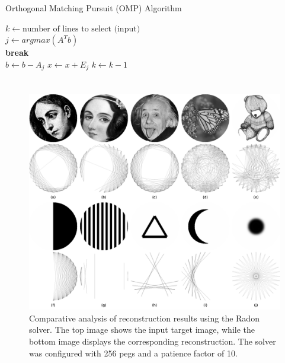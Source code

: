 \chapter{}
\label{app:omp}

\begin{algorithm}
\caption{Orthogonal Matching Pursuit (OMP) Algorithm}
\begin{algorithmic}[1]
\State $k \gets \text{number of lines to select (input)}$ \\

    \State $j \gets argmax(A^Tb)$  \\

        \State \textbf{break}
    \EndIf \\

    \State $b \gets b - A_j$ 
    \State $x \gets x + E_j$
    \State $k \gets k - 1$
\EndWhile
\end{algorithmic}
\end{algorithm}

\chapter{}
\label{app:radon_quantitative}

\begin{figure}[H]
    \centering
    \includegraphics[width=\linewidth]{images/radon/radon_quantitative_test.pdf}
    \caption{Comparative analysis of reconstruction results using the Radon solver. The top image shows the input target image, while the bottom image displays the corresponding reconstruction. The solver was configured with 256 pegs and a patience factor of 10.}
    \label{fig:radon_quantitative}
\end{figure}

